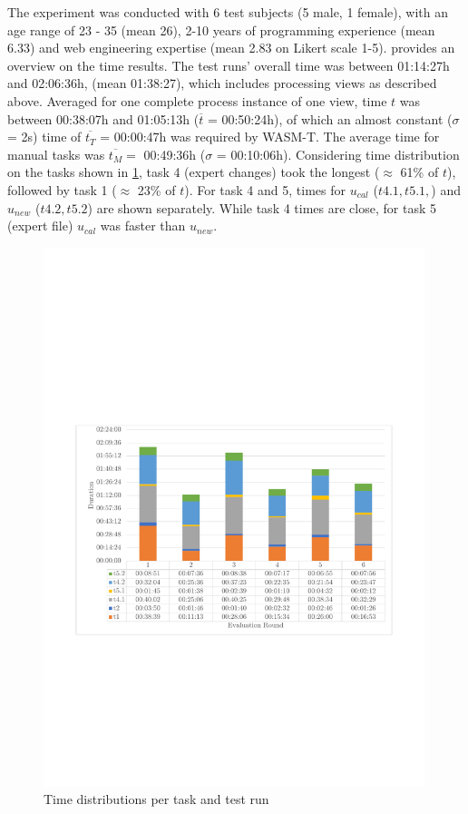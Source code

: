 The experiment was conducted with 6 test subjects (5 male, 1 female), with an age range of 23 - 35 (mean 26), 2-10 years of programming experience (mean 6.33) and web engineering expertise (mean 2.83 on Likert scale 1-5).
 provides an overview on the time results.
The test runs' overall time was between 01:14:27h and 02:06:36h, (mean 01:38:27), which includes processing views as described above.
Averaged for one complete process instance of one view, time \(t\) was between 00:38:07h and 01:05:13h (\(\overline t\) = 00:50:24h), of which an almost constant (\(\sigma\) = 2s) time of \(\overline{t_T}\) = 00:00:47h was required by WASM-T.
The average time for manual tasks was \(\overline{t_M}=\) 00:49:36h (\(\sigma\) = 00:10:06h).
Considering time distribution on the tasks shown in \cref{fig:awsm.rm.rewamp.timetask}, task 4 (expert changes) took the longest (\(\approx\) 61\% of \(t\)), followed by task 1 (\(\approx\) 23\% of \(t\)).
For task 4 and 5, times for \(u_{cal}\) (\(t4.1, t5.1,\)) and \(u_{new}\) (\(t4.2, t5.2\)) are shown separately.
While task 4 times are close, for task 5 (expert file) \(u_{cal}\) was faster than \(u_{new}\).

\begin{figure}
\hypertarget{fig:awsm.rm.rewamp.timetask}{%
\centering
\includegraphics[width=0.99\textwidth]{../figures/rewamp/time-task.pdf}
\caption{Time distributions per task and test run}\label{fig:awsm.rm.rewamp.timetask}
}
\end{figure}

